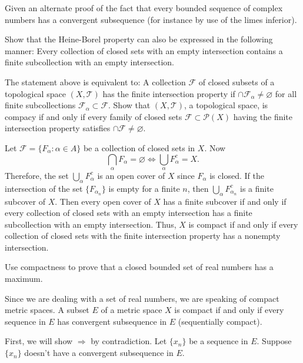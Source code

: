 \begin{exercise}
\item
  Given an alternate proof of the fact that every bounded sequence of complex
  numbers has a convergent subsequence (for instance by use of the limes
  inferior).
\item
  Show that the Heine-Borel property can also be expressed in the following
  manner: Every collection of closed sets with an empty intersection contains
  a finite subcollection with an empty intersection.
  \par\smallskip
  The statement above is equivalent to: A collection \(\mathcal{F}\) of closed
  subsets of a topological space \((X,\mathcal{T})\) has the finite
  intersection property if \(\cap\mathcal{F}_{\alpha}\neq\varnothing\) for all
  finite subcollections \(\mathcal{F}_{\alpha}\subset\mathcal{F}\).
  Show that \((X,\mathcal{T})\), a topological space, is compacy if and only
  if every family of closed sets \(\mathcal{F}\subset\mathcal{P}(X)\) having
  the finite intersection property satisfies
  \(\cap\mathcal{F}\neq\varnothing\).
  \par\smallskip
  Let \(\mathcal{F} = \{F_{\alpha}\colon\alpha\in A\}\) be a collection of
  closed sets in \(X\).
  Now
  \[
  \bigcap_{\alpha}F_{\alpha} = \varnothing\iff\bigcup_{\alpha}F_{\alpha}^c = X.
  \]
  Therefore, the set \(\bigcup_{\alpha}F_{\alpha}^c\) is an open cover of
  \(X\) since \(F_{\alpha}\) is closed.
  If the intersection of the set \(\{F_{\alpha_n}\}\) is empty for a finite
  \(n\), then \(\bigcup_{\alpha}F_{\alpha_n}^c\) is a finite subcover of \(X\).
  Then every open cover of \(X\) has a finite subcover if and only if every
  collection of closed sets with an empty intersection has a finite
  subcollection with an empty intersection.
  Thus, \(X\) is compact if and only if every collection of closed sets with
  the finite intersection property has a nonempty intersection.
\item
  Use compactness to prove that a closed bounded set of real numbers has a
  maximum.
  \par\smallskip
  Since we are dealing with a set of real numbers, we are speaking of compact
  metric spaces.
  A subset \(E\) of a metric space \(X\) is compact if and only if every
  sequence in \(E\) has convergent subsequence in \(E\) (sequentially
  compact).
  \par\smallskip
  First, we will show \(\Rightarrow\) by contradiction.
  Let \(\{x_n\}\) be a sequence in \(E\).
  Suppose \(\{x_n\}\) doesn't have a convergent subsequence in \(E\).

\end{exercise}
